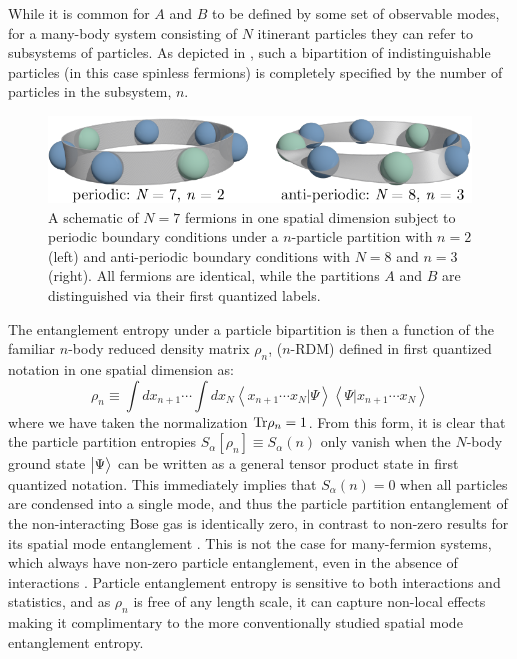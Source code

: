 While it is common for $A$ and $B$ to be defined by some set of observable modes, for a
many-body system consisting of $N$ itinerant particles they can refer to 
subsystems of particles.  As depicted in ,
such a bipartition of indistinguishable particles (in this case spinless
fermions) is completely specified by the number of particles in the subsystem,
$n$. 
%
\begin{figure}[t]
\begin{center}
\includegraphics[width=0.7\columnwidth]{Chapters/particle_entanglement_boundary_conditions.pdf}
\end{center}
\caption{A schematic of $N=7$ fermions in one spatial dimension subject to
periodic boundary conditions under a $n$-particle partition with $n=2$ 
(left) and anti-periodic boundary conditions with $N=8$ and $n=3$ (right).  All fermions
are identical, while the partitions $A$ and $B$ are distinguished via
their first quantized labels.}
\label{fig:particle_partition}
\end{figure}
%
The entanglement entropy under a particle bipartition is then a function of the
familiar $n$-body reduced density matrix $\rho_n$, ($n$-RDM) defined in first
quantized notation in one spatial dimension as: 
%
\begin{equation}
\rho_n \equiv \int dx_{n+1} \cdots \int d x_{N}\left
\langle {x}_{n+1} \cdots {x}_{N} \vert \Psi \right
\rangle \left \langle \Psi \vert {x}_{n+1}\cdots {x_{N}} \right \rangle 
\label{eq:rhon}
\end{equation}
%
where we have taken the normalization ${\rm Tr} \rho_n = 1$. From this form, it
is clear that the particle partition \ren entropies $S_\alpha[\rho_n] \equiv
S_\alpha(n)$ only vanish when the $N$-body ground state $\bigl \vert \Psi \bigr \rangle$ can be
written as a general tensor product state in first quantized notation. This
immediately implies that $S_\alpha(n)=0$ when all particles are condensed into
a single mode, and thus the particle partition entanglement of
the non-interacting Bose gas is identically zero, in contrast to non-zero
results for its spatial mode entanglement \cite{Simon:2002it, Ding:2009gq}.
This is not the case for many-fermion systems, which always have non-zero
particle entanglement, even in the absence of interactions \cite{Zanardi:2002jw}.  Particle
entanglement entropy is sensitive to both interactions and 
statistics, and as $\rho_n$ is free of any length scale, it can capture
non-local effects making it complimentary to the more conventionally studied
spatial mode entanglement entropy.

